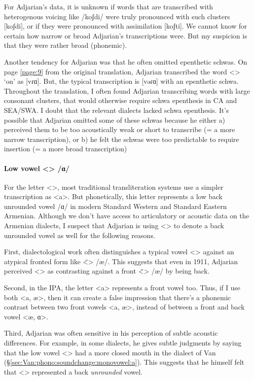 For Adjarian's data, it is unknown if words that are transcribed with heterogenous voicing like /koʃdi/ were truly pronounced with such clusters [koʃdi], or if they were pronounced with assimilation [koʃti]. We cannot know for certain how narrow or broad  Adjarian's transcriptions were. But my suspicion is that they were rather broad (phonemic). 

Another   tendency for Adjarian was that he often omitted epenthetic schwas. On page \ref{page:9} from the original translation, Adjarian transcribed the word <> `on' as [vɾɑ]. But, the typical transcription is [vəɾɑ] with an epenthetic schwa. Throughout the translation, I often found Adjarian transcribing words with large consonant clusters, that would otherwise require schwa epenthesis in CA and SEA/SWA. I doubt that the relevant dialects lacked schwa epenthesis. It's possible that  Adjarian omitted some of these schwas because he either a) perceived them to be too acoustically weak or short to transcribe (= a more narrow transcription), or b) he felt the schwas were too predictable to require insertion (= a more broad transcription) 



\paragraph{Low vowel <> /ɑ/}

For the letter <>, most traditional transliteration systems use a simpler transcription as <a>. But phonetically, this letter represents a low back unrounded vowel /ɑ/ in modern Standard Western and Standard Eastern Armenian. Although we don't have access to articulatory or acoustic data on the Armenian dialects, I suspect that Adjarian is using <> to denote a back unrounded vowel as well for the following reasons. 


First, dialectological work often distinguishes a typical vowel <> against an atypical fronted form like <̈> /æ/. This suggests that even in 1911, Adjarian perceived <> as contrasting against a front <̈> /æ/ by being back. 

Second, in the IPA, the letter <a> represents a front vowel too. Thus, if I use both <a, æ>, then it can create a false impression that there's a phonemic contrast between two front vowels <a, æ>, instead of between a front and back vowel <æ, ɑ>. 
	
	Third, Adjarian was often sensitive in his perception of subtle acoustic differences. For example, in some dialects, he gives subtle judgments by saying that the low vowel <> had a more closed mouth in the dialect of Van (\S\ref{sec:Van:phono:soundchange:monovowel:a}). This suggests that he himself felt that <> represented a back \textit{unrounded} vowel. 
	
